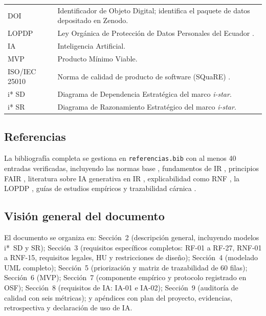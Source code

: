 \documentclass[11pt,a4paper]{article}
\begin{document}
\begin{longtable}{|p{3.5cm}|p{11cm}|}
DOI & Identificador de Objeto Digital; identifica el paquete de datos depositado en Zenodo. \\
LOPDP & Ley Orgánica de Protección de Datos Personales del Ecuador \cite{lopd2021}. \\
IA & Inteligencia Artificial. \\
MVP & Producto Mínimo Viable. \\
ISO/IEC 25010 & Norma de calidad de producto de software (SQuaRE) \cite{iso25010}. \\
i* SD & Diagrama de Dependencia Estratégica del marco \textit{i-star}. \\
i* SR & Diagrama de Razonamiento Estratégico del marco \textit{i-star}. \\
\hline
\end{longtable}

\subsection{Referencias}

La bibliografía completa se gestiona en \texttt{referencias.bib} con al menos 40 entradas verificadas, incluyendo las normas base \cite{iso29148,iso25010}, fundamentos de IR \cite{pohl2010,swebok2024}, principios FAIR \cite{wilkinson2016fair}, literatura sobre IA generativa en IR \cite{cheng2026genai,arora2024genai,vogelsang2024llm}, explicabilidad como RNF \cite{chazette2020explainability,chazette2021exploring,chazette2022explainable}, la LOPDP \cite{lopd2021}, guías de estudios empíricos \cite{molleri2020checklist,hennink2017saturation,runeson2009casestudy,wohlin2012experimentation,nosek2018preregistration,cohen1960kappa,fleiss1971kappa,ferrari2016ambiguity,fischbach2023acceptance,kitchenham2007slr} y trazabilidad cárnica \cite{chen2021blockchain,beck2021blockchainmeat}.

\subsection{Visión general del documento}

El documento se organiza en: Sección~2 (descripción general, incluyendo modelos i*~SD y SR); Sección~3 (requisitos específicos completos: RF-01 a RF-27, RNF-01 a RNF-15, requisitos legales, HU y restricciones de diseño); Sección~4 (modelado UML completo); Sección~5 (priorización y matriz de trazabilidad de 60 filas); Sección~6 (MVP); Sección~7 (componente empírico y protocolo registrado en OSF); Sección~8 (requisitos de IA: IA-01 e IA-02); Sección~9 (auditoría de calidad con seis métricas); y apéndices con plan del proyecto, evidencias, retrospectiva y declaración de uso de IA.
\end{document}
